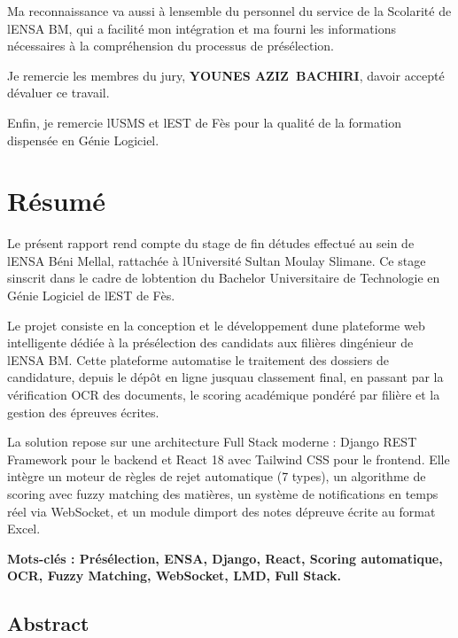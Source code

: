 \documentclass[
]{article}
\begin{document}
Ma reconnaissance va aussi à l\textquotesingle ensemble du personnel du
service de la Scolarité de l\textquotesingle ENSA BM, qui a facilité mon
intégration et m\textquotesingle a fourni les informations nécessaires à
la compréhension du processus de présélection.

Je remercie les membres du jury, \textbf{YOUNES AZIZ~BACHIRI},
d\textquotesingle avoir accepté d\textquotesingle évaluer ce travail.

Enfin, je remercie l\textquotesingle USMS et l\textquotesingle EST de
Fès pour la qualité de la formation dispensée en Génie Logiciel.

\hypertarget{ruxe9sumuxe9}{%
\section{Résumé}\label{ruxe9sumuxe9}}

Le présent rapport rend compte du stage de fin d\textquotesingle études
effectué au sein de l\textquotesingle ENSA Béni Mellal, rattachée à
l\textquotesingle Université Sultan Moulay Slimane. Ce stage
s\textquotesingle inscrit dans le cadre de l\textquotesingle obtention
du Bachelor Universitaire de Technologie en Génie Logiciel de
l\textquotesingle EST de Fès.

Le projet consiste en la conception et le développement
d\textquotesingle une plateforme web intelligente dédiée à la
présélection des candidats aux filières d\textquotesingle ingénieur de
l\textquotesingle ENSA BM. Cette plateforme automatise le traitement des
dossiers de candidature, depuis le dépôt en ligne
jusqu\textquotesingle au classement final, en passant par la
vérification OCR des documents, le scoring académique pondéré par
filière et la gestion des épreuves écrites.

La solution repose sur une architecture Full Stack moderne : Django REST
Framework pour le backend et React 18 avec Tailwind CSS pour le
frontend. Elle intègre un moteur de règles de rejet automatique (7
types), un algorithme de scoring avec fuzzy matching des matières, un
système de notifications en temps réel via WebSocket, et un module
d\textquotesingle import des notes d\textquotesingle épreuve écrite au
format Excel.

\textbf{Mots-clés : Présélection, ENSA, Django, React, Scoring
automatique, OCR, Fuzzy Matching, WebSocket, LMD, Full Stack.}

\hypertarget{abstract}{%
\subsection{Abstract}\label{abstract}}
\end{document}
